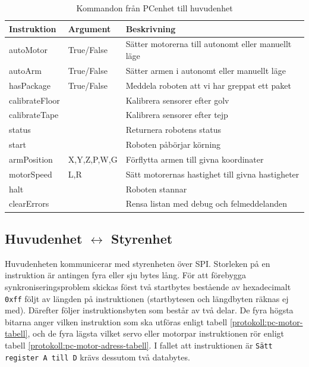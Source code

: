 \begin{table}[h!]
	\centering
	\begin{tabularx}{\textwidth}{| l | l | X |}
		\hline
		\textbf{Instruktion} & \textbf{Argument} & \textbf{Beskrivning} \\\hline
		{autoMotor} & {True/False} & {Sätter motorerna till autonomt eller manuellt läge} \\\hline
		{autoArm} & {True/False} & {Sätter armen i autonomt eller manuellt läge} \\\hline
		{hasPackage} & {True/False} & {Meddela roboten att vi har greppat ett paket} \\\hline
		{calibrateFloor} & {} & {Kalibrera sensorer efter golv} \\\hline
		{calibrateTape} & {} & {Kalibrera sensorer efter tejp} \\\hline
		{status} & {} & {Returnera robotens status} \\\hline
		{start} & {} & {Roboten påbörjar körning} \\\hline
		{armPosition} & {X,Y,Z,P,W,G} & {Förflytta armen till givna koordinater} \\\hline
		{motorSpeed} & {L,R} & {Sätt motorernas hastighet till givna hastigheter} \\\hline
		{halt} & {} & {Roboten stannar} \\\hline
		{clearErrors} & {} & {Rensa listan med debug och felmeddelanden} \\\hline
	\end{tabularx}
	\caption{Kommandon från PCenhet till huvudenhet} \label{protokoll:pc-huvud-tabell}
\end{table}

\subsection{Huvudenhet $\longleftrightarrow$ Styrenhet} \label{protokoll-huvud-styr}

Huvudenheten kommunicerar med styrenheten över SPI. Storleken på en instruktion är antingen fyra eller sju bytes lång. För att förebygga synkroniseringsproblem skickas först två startbytes bestående av hexadecimalt \texttt{0xff} följt av längden på instruktionen (startbytesen och längdbyten räknas ej med). Därefter följer instruktionsbyten som består av två delar. De fyra högsta bitarna anger vilken instruktion som ska utföras enligt tabell \ref{protokoll:pc-motor-tabell}, och de fyra lägsta vilket servo eller motorpar instruktionen rör enligt tabell \ref{protokoll:pc-motor-adress-tabell}. I fallet att instruktionen är \texttt{Sätt register A till D} krävs dessutom två databytes.


